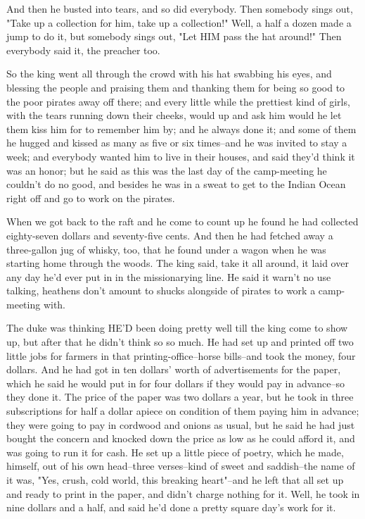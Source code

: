 And then he busted into tears, and so did everybody.  Then somebody sings
out, "Take up a collection for him, take up a collection!"  Well, a half
a dozen made a jump to do it, but somebody sings out, "Let HIM pass the
hat around!"  Then everybody said it, the preacher too.

So the king went all through the crowd with his hat swabbing his eyes,
and blessing the people and praising them and thanking them for being so
good to the poor pirates away off there; and every little while the
prettiest kind of girls, with the tears running down their cheeks, would
up and ask him would he let them kiss him for to remember him by; and he
always done it; and some of them he hugged and kissed as many as five or
six times--and he was invited to stay a week; and everybody wanted him to
live in their houses, and said they'd think it was an honor; but he said
as this was the last day of the camp-meeting he couldn't do no good, and
besides he was in a sweat to get to the Indian Ocean right off and go to
work on the pirates.

When we got back to the raft and he come to count up he found he had
collected eighty-seven dollars and seventy-five cents.  And then he had
fetched away a three-gallon jug of whisky, too, that he found under a
wagon when he was starting home through the woods.  The king said, take
it all around, it laid over any day he'd ever put in in the missionarying
line.  He said it warn't no use talking, heathens don't amount to shucks
alongside of pirates to work a camp-meeting with.

The duke was thinking HE'D been doing pretty well till the king come to
show up, but after that he didn't think so so much.  He had set up and
printed off two little jobs for farmers in that printing-office--horse
bills--and took the money, four dollars.  And he had got in ten
dollars' worth of advertisements for the paper, which he said he would
put in for four dollars if they would pay in advance--so they done it.
The price of the paper was two dollars a year, but he took in three
subscriptions for half a dollar apiece on condition of them paying him in
advance; they were going to pay in cordwood and onions as usual, but he
said he had just bought the concern and knocked down the price as low as
he could afford it, and was going to run it for cash.  He set up a little
piece of poetry, which he made, himself, out of his own head--three
verses--kind of sweet and saddish--the name of it was, "Yes, crush, cold
world, this breaking heart"--and he left that all set up and ready to
print in the paper, and didn't charge nothing for it.  Well, he took in
nine dollars and a half, and said he'd done a pretty square day's work
for it.

